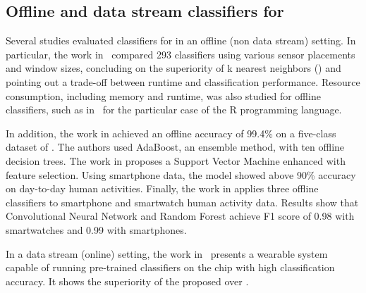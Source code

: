 \subsection{Offline and data stream classifiers for \har}
Several studies evaluated classifiers for \har in an offline (non data stream)
setting. In particular, the work in~\cite{Janidarmian_2017} compared 293
classifiers using various sensor placements and window sizes, concluding on the
superiority of k nearest neighbors (\knn) and pointing out a trade-off between
runtime and classification performance. Resource consumption, including memory
and runtime, was also studied for offline classifiers, such as
in~\cite{memory_consumption_machine_learning} for the particular case of the R
programming language.

In addition, the work in \cite{ugulino2012} achieved an offline accuracy of
99.4\% on a five-class dataset of \har. The authors used AdaBoost, an ensemble
method, with ten offline decision trees. The work in \cite{ahmed2019smartphone}
proposes a Support Vector Machine enhanced with feature selection. Using
smartphone data, the model showed above 90\% accuracy on day-to-day human
activities. Finally, the work in \cite{san2018robust} applies three offline
classifiers to smartphone and smartwatch human activity data. Results show that
Convolutional Neural Network and Random Forest achieve F1 score of 0.98 with
smartwatches and 0.99 with smartphones.

In a data stream (online) setting, the work in~\cite{omid_2019} presents a
wearable system capable of running pre-trained classifiers on the chip with high
classification accuracy. It shows the superiority of the proposed \FNN over
\knn.


